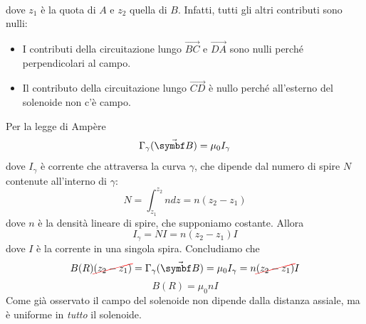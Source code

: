 \begin{examplewt}
\begin{align*}
	\end{align*}
	dove $z_1$ è la quota di $A$ e $z_2$ quella di $B$. Infatti, tutti gli altri contributi sono nulli:
	\begin{itemize}
		\item I contributi della circuitazione lungo  $\overrightarrow{BC}$ e $\overrightarrow{DA}$ sono nulli perché perpendicolari al campo.
		\item Il contributo della circuitazione lungo $\overrightarrow{CD}$ è nullo perché all'esterno del solenoide non c'è campo.
	\end{itemize}
	Per la legge di Ampère
	\begin{equation*}
		\Gamma_{\gamma}(\vba{B})=\mu_0I_\gamma
	\end{equation*}
	dove $I_\gamma$ è corrente che attraversa la curva $\gamma$, che dipende dal numero di spire $N$ contenute all'interno di $\gamma$:
	\begin{equation*}
		N=\int_{z_1}^{z_2}ndz=n\left(z_2-z_1\right)
	\end{equation*}
	dove $n$ è la densità lineare di spire, che supponiamo costante. Allora
	\begin{equation*}
		I_{\gamma}=N I = n\left(z_2-z_1\right) I
	\end{equation*}
	dove $I$ è la corrente in una singola spira. Concludiamo che
	\begin{equation*}
		B(R)\Ccancel[red]{(z_2-z_1)}=\Gamma_{\gamma}(\vba{B})=\mu_0I_\gamma=n\Ccancel[red]{(z_2-z_1)} I
	\end{equation*}
	\begin{equation}
		B(R)=\mu_0 n I
	\end{equation}
	Come già osservato il campo del solenoide non dipende dalla distanza assiale, ma è uniforme in \textit{tutto} il solenoide. 
\end{examplewt}
